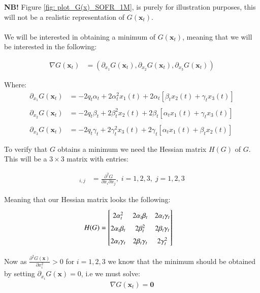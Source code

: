 \textbf{NB!} Figure \ref{fig: plot_G(x)_SOFR_1M}, is purely for illustration purposes, this will not be a realistic representation of $G(\mathbf{x}_{t})$. 
\\~\\
We will be interested in obtaining a minimum of $G(\mathbf{x}_{t})$, meaning that we will be interested in the following:  

\begin{align*}
\nabla G(\mathbf{x}_{t}) &= 
\left(
\partial_{x_{1}}G(\mathbf{x}_{t}), 
\partial_{x_{2}}G(\mathbf{x}_{t}), 
\partial_{x_{3}}G(\mathbf{x}_{t})
\right) 
\end{align*}

Where: 
\begin{align*}
\partial_{x_{1}}G(\mathbf{x}_{t}) &= 
-2q_{t}\alpha_{t} 
+ 2 \alpha_{t}^{2}x_{1}(t)  
+ 2\alpha_{t}\left[
\beta_{t} x_{2}(t)+ \gamma_{t} x_{3}(t)
\right] \\ 
\\
\partial_{x_{2}}G(\mathbf{x}_{t}) &=
-2q_{t}\beta_{t}
+ 2\beta_{t}^{2} x_{2}(t)
+ 2\beta_{t}\left[
\alpha_{t} x_{1}(t) + \gamma_{t} x_{3}(t)
\right] \\ 
\\ 
\partial_{x_{3}}G(\mathbf{x}_{t}) &=
-2q_{t}\gamma_{t}
+ 2\gamma_{t}^{2}x_{3}(t)
+ 2\gamma_{t}\left[
\alpha_{t} x_{1}(t) + \beta_{t} x_{2}(t)
\right]
\end{align*}

To verify that $G$ obtains a minimum we need the Hessian matrix $H(G)$ of $G$. This will be a $3\times 3$ matrix with entries:  

\begin{align*}
[H(G)]_{i,j} &= 
\frac{
\partial^{2}G
}{
\partial x_{i}\partial x_{j}
}, \; i=1,2,3,\;j=1,2,3
\end{align*}

Meaning that our Hessian matrix looks the following:
\begin{align*}
H(G) &= 
\begingroup
\renewcommand*{\arraystretch}{1.5}
\begin{bmatrix}
2\alpha_{t}^{2} & 
2\alpha_{t} \beta_{t} & 
2\alpha_{t} \gamma_{t} \\ 
2\alpha_{t} \beta_{t} &
2\beta_{t}^{2} &
2\beta_{t} \gamma_{t} \\
2\alpha_{t} \gamma_{t} &
2\beta_{t} \gamma_{t} & 
2\gamma_{t}^{2}
\end{bmatrix}
\endgroup
\end{align*}


Now as $\frac{\partial^{2}G(\mathbf{x}) }{\partial x_{i}^{2}} > 0$ for $i=1,2,3$ we know that the minimum should be obtained by setting $\partial_{x_{i}}G(\mathbf{x}) = 0$, i.e we must solve: 
\begin{align}
\label{eq: partial_derivative_equal_zero}
\nabla G(\mathbf{x}_{t}) = \mathbf{0}    
\end{align}

